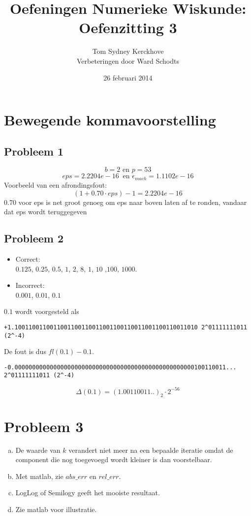 \documentclass[12pt,a4paper]{article}
\author{Tom Sydney Kerckhove
		\\ Verbeteringen door Ward Schodts}
\title{Oefeningen Numerieke Wiskunde:\\ Oefenzitting 3}
\date{26 februari 2014}
\begin{document}
\maketitle
\section{Bewegende kommavoorstelling}
\subsection{Probleem 1}
\[
b = 2 \text{ en } p = 53
\]
\[
eps = 2.2204e-16\ \text{ en } \epsilon_{mach} = 1.1102e-16
\]
Voorbeeld van een afrondingsfout:
\[
(1+0.70\cdot eps) -1 = 2.2204e-16
\]
0.70 voor eps is net groot genoeg om eps naar boven laten af te ronden, vandaar dat eps wordt teruggegeven
\subsection{Probleem 2}
\begin{itemize}
\item Correct:\\
$0.125$, $0.25$, $0.5$, $1$, $2$, $8$, $1$, $10$ ,$100$, $1000$.
\item Incorrect:\\
$0.001$, $0.01$, $0.1$
\end{itemize}
$0.1$ wordt voorgesteld als
{\scriptsize \begin{verbatim}
+1.1001100110011001100110011001100110011001100110011010 2^01111111011 (2^-4)
\end{verbatim}}
De fout is dus $fl(0.1)-0.1$.
{\scriptsize \begin{verbatim}
-0.000000000000000000000000000000000000000000000000000100110011...  2^01111111011 (2^-4)
\end{verbatim}}
\[
\Delta(0.1) = (1.00110011..)_{2} \cdot 2^{-56}
\]

\section{Probleem 3}
\begin{enumerate}[(a)]
\item
De waarde van $k$ verandert niet meer na een bepaalde iteratie omdat de component die nog toegevoegd wordt kleiner is dan voorstelbaar.

\item
Met matlab, zie $abs\_err$ en $rel\_err$.

\item
LogLog of Semilogy geeft het mooiste resultaat.

\item
Zie matlab voor illustratie.

\end{enumerate}
\end{document}
